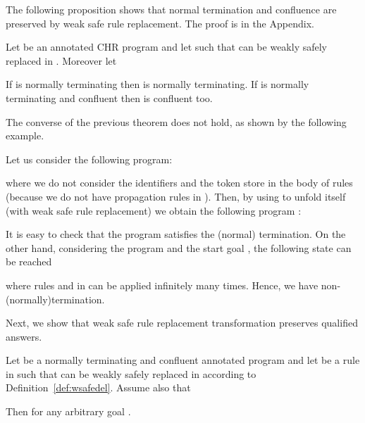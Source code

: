 \documentclass{tlp}
\begin{document}
The following proposition shows that normal termination and confluence
are preserved by weak safe rule replacement. The proof is in the Appendix.


\begin{proposition}\label{prop:wterm}
Let  be an annotated CHR program and let  such that 
can be weakly safely replaced in . Moreover let

If  is normally terminating then  is normally terminating. If  is normally terminating and confluent then  is confluent too.
\end{proposition}

The converse of the previous theorem does not hold, as shown by the following example.
\begin{example}\label{ex:wconfluence-problem}
Let us consider the following program:

where we do not consider the identifiers and the token store in the
body of rules (because we do not have propagation rules in ).
Then, by using  to unfold  itself (with weak safe rule replacement) we obtain the following program :

It is easy to check that the program  satisfies the (normal) termination.
On the other hand, considering the program  and the start goal , the following state can be reached

where rules  and  in  can be applied infinitely many times.
Hence, we have non-(normally)termination.\end{example}


Next, we show that weak safe rule replacement transformation preserves qualified answers.

\begin{theorem}\label{prop:wqualified}
Let  be a normally terminating and confluent annotated program and let  be a rule in  such that
 can be weakly safely replaced
in  according to Definition~\ref{def:wsafedel}. Assume also that

Then  for any arbitrary
goal .
\end{theorem}
\end{document}
